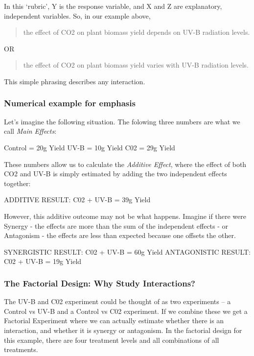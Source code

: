 \documentclass[
]{book}
\begin{document}
In this `rubric', Y is the response variable, and X and Z are explanatory, independent variables. So, in our example above,

\begin{quote}
the effect of CO2 on plant biomass yield depends on UV-B radiation levels.
\end{quote}

OR

\begin{quote}
the effect of CO2 on plant biomass yield varies with UV-B radiation levels.
\end{quote}

This simple phrasing describes any interaction.

\hypertarget{numerical-example-for-emphasis}{%
\subsubsection{Numerical example for emphasis}\label{numerical-example-for-emphasis}}

Let's imagine the following situation. The folowing three numbers are what we call \emph{Main Effects}:

Control = 20g Yield
UV-B = 10g Yield
C02 = 29g Yield

These numbers allow us to calculate the \emph{Additive Effect}, where the effect of both CO2 and UV-B is simply estimated by adding the two independent effects together:

ADDITIVE RESULT: C02 + UV-B = 39g Yield

However, this additive outcome may not be what happens. Imagine if there were Synergy - the effects are more than the sum of the independent effects - or Antagonism - the effects are less than expected because one offsets the other.

SYNERGISTIC RESULT: C02 + UV-B = 60g Yield
ANTAGONISTIC RESULT: C02 + UV-B = 19g Yield

\hypertarget{the-factorial-design-why-study-interactions}{%
\subsubsection{The Factorial Design: Why Study Interactions?}\label{the-factorial-design-why-study-interactions}}

The UV-B and C02 experiment could be thought of as two experiments -- a Control vs UV-B and a Control vs C02 experiment. If we combine these we get a Factorial Experiment where we can actually estimate whether there is an interaction, and whether it is synergy or antagonism. In the factorial design for this example, there are four treatment levels and all combinations of all treatments.
\end{document}
